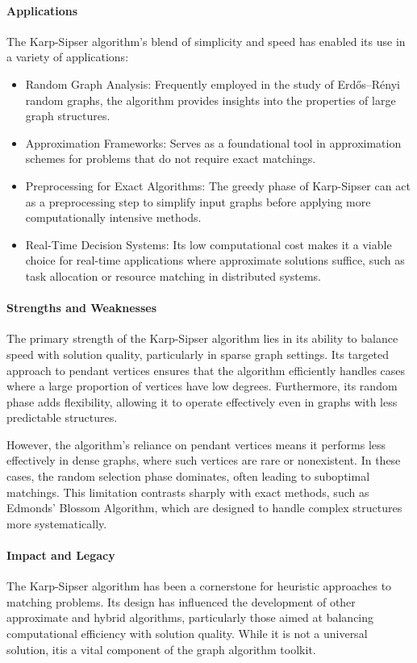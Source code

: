 \paragraph{Applications}
The Karp-Sipser algorithm’s blend of simplicity and speed has enabled its use in a variety of applications:
\begin{itemize}
    \item Random Graph Analysis:
    Frequently employed in the study of Erdős–Rényi random graphs, the algorithm provides insights into the properties of large graph structures.
    \item Approximation Frameworks:
    Serves as a foundational tool in approximation schemes for problems that do not require exact matchings.
    \item Preprocessing for Exact Algorithms:
    The greedy phase of Karp-Sipser can act as a preprocessing step to simplify input graphs before applying more computationally intensive methods.
    \item Real-Time Decision Systems:
    Its low computational cost makes it a viable choice for real-time applications where approximate solutions suffice, such as task allocation or resource matching in distributed systems.
\end{itemize}

\paragraph{Strengths and Weaknesses}
The primary strength of the Karp-Sipser algorithm lies in its ability to balance speed with solution quality, particularly in sparse graph settings. Its targeted approach to pendant vertices ensures that the algorithm efficiently handles cases where a large proportion of vertices have low degrees. Furthermore, its random phase adds flexibility, allowing it to operate effectively even in graphs with less predictable structures.

However, the algorithm’s reliance on pendant vertices means it performs less effectively in dense graphs, where such vertices are rare or nonexistent. In these cases, the random selection phase dominates, often leading to suboptimal matchings. This limitation contrasts sharply with exact methods, such as Edmonds' Blossom Algorithm, which are designed to handle complex structures more systematically.

\paragraph{Impact and Legacy}
The Karp-Sipser algorithm has been a cornerstone for heuristic approaches to matching problems. Its design has influenced the development of other approximate and hybrid algorithms, particularly those aimed at balancing computational efficiency with solution quality. While it is not a universal solution, itis a vital component of the graph algorithm toolkit.

